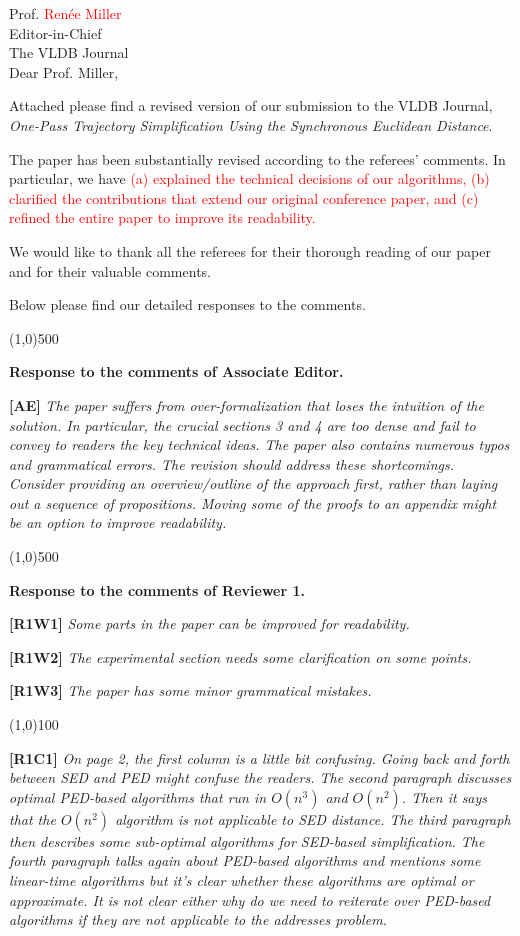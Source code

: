 \documentclass{letter}
\newcommand{\marked}[1]{\textcolor{red}{#1}}
\begin{document}
Prof. \marked{Renée Miller} \\
Editor-in-Chief		\\
The VLDB Journal	\\



Dear Prof. Miller,

Attached please find a revised version of our submission to
the VLDB Journal, \emph{One-Pass Trajectory Simplification Using the Synchronous Euclidean Distance}.


The paper has been substantially revised according to the referees' comments. In particular, we have \marked{ (a) explained the technical decisions of our algorithms, (b) clarified the contributions that extend our original conference paper, and (c) refined the entire paper to improve its readability.}

We would like to thank all the referees for their thorough reading of our paper and for their valuable comments.

Below please find our detailed responses to the comments.


\line(1,0){500}

\textbf{Response to the comments of Associate Editor.}

\textbf{[AE]} \emph{The paper suffers from over-formalization that loses the intuition of the solution. In particular, the crucial sections 3 and 4 are too dense and fail to convey to readers the key technical ideas. The paper also contains numerous typos and grammatical errors. The revision should address these shortcomings. Consider providing an overview/outline of the approach first, rather than laying out a sequence of propositions. Moving some of the proofs to an appendix might be an option to improve readability. }




\line(1,0){500}

\textbf{Response to the comments of Reviewer 1.}

\textbf{[R1W1]} \emph{Some parts in the paper can be improved for readability.}

\textbf{[R1W2]} \emph{The experimental section needs some clarification on some points.}

\textbf{[R1W3]} \emph{The paper has some minor grammatical mistakes.}

\line(1,0){100}

\textbf{[R1C1]} \emph{On page 2, the first column is a little bit confusing. Going back and forth between SED and PED might confuse the readers. The second paragraph discusses optimal PED-based algorithms that run in $O(n^3)$ and $O(n^2)$. Then it says that the $O(n^2)$ algorithm is not applicable to SED distance. The third paragraph then describes some sub-optimal algorithms for SED-based simplification. {The fourth paragraph talks again about PED-based algorithms and mentions some linear-time algorithms but it's clear whether these algorithms are optimal or approximate. It is not clear either why do we need to reiterate over PED-based algorithms if they are not applicable to the addresses problem.}}
 
\end{document}
